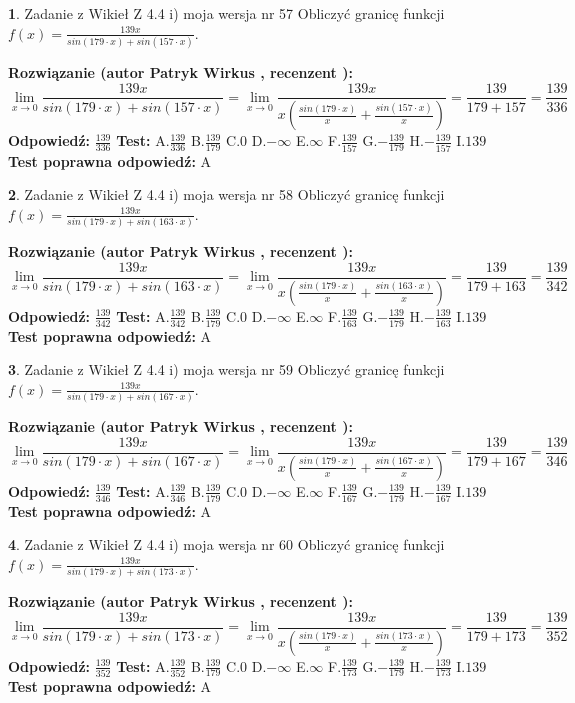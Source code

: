 \documentclass[12pt, a4paper]{article}
\theoremstyle{definition} %
\newtheorem{zad}{}
\newcommand{\zadStart}[1]{\begin{zad}#1\newline}
\newcommand{\zadStop}{\end{zad}}
\newcommand{\rozwStart}[2]{\noindent \textbf{Rozwiązanie (autor #1 , recenzent #2): }\newline}
\newcommand{\rozwStop}{\newline}
\newcommand{\odpStart}{\noindent \textbf{Odpowiedź:}\newline}
\newcommand{\odpStop}{\newline}
\newcommand{\testStart}{\noindent \textbf{Test:}\newline}
\newcommand{\testStop}{\newline}
\newcommand{\kluczStart}{\noindent \textbf{Test poprawna odpowiedź:}\newline}
\newcommand{\kluczStop}{\newline}
\begin{document}
\zadStart{Zadanie z Wikieł Z 4.4 i) moja wersja nr 57}
Obliczyć granicę funkcji $f(x)=\frac{139x}{sin(179\cdot x) +sin(157\cdot x)}$.
\zadStop
\rozwStart{Patryk Wirkus}{}
$$\lim\limits_{x\to 0}\frac{139x}{sin(179\cdot x) +sin(157\cdot x)}=\lim\limits_{x\to 0}\frac{139x}{x(\frac{sin(179\cdot x)}{x}+\frac{sin(157\cdot x)}{x})}=\frac{139}{179+157} = \frac{139}{336}$$
\rozwStop
\odpStart
$\frac{139}{336}$
\odpStop
\testStart
A.$\frac{139}{336}$
B.$\frac{139}{179}$
C.$0$
D.$-\infty$
E.$\infty$
F.$\frac{139}{157}$
G.$-\frac{139}{179}$
H.$-\frac{139}{157}$
I.$139$
\testStop
\kluczStart
A
\kluczStop



\zadStart{Zadanie z Wikieł Z 4.4 i) moja wersja nr 58}
Obliczyć granicę funkcji $f(x)=\frac{139x}{sin(179\cdot x) +sin(163\cdot x)}$.
\zadStop
\rozwStart{Patryk Wirkus}{}
$$\lim\limits_{x\to 0}\frac{139x}{sin(179\cdot x) +sin(163\cdot x)}=\lim\limits_{x\to 0}\frac{139x}{x(\frac{sin(179\cdot x)}{x}+\frac{sin(163\cdot x)}{x})}=\frac{139}{179+163} = \frac{139}{342}$$
\rozwStop
\odpStart
$\frac{139}{342}$
\odpStop
\testStart
A.$\frac{139}{342}$
B.$\frac{139}{179}$
C.$0$
D.$-\infty$
E.$\infty$
F.$\frac{139}{163}$
G.$-\frac{139}{179}$
H.$-\frac{139}{163}$
I.$139$
\testStop
\kluczStart
A
\kluczStop



\zadStart{Zadanie z Wikieł Z 4.4 i) moja wersja nr 59}
Obliczyć granicę funkcji $f(x)=\frac{139x}{sin(179\cdot x) +sin(167\cdot x)}$.
\zadStop
\rozwStart{Patryk Wirkus}{}
$$\lim\limits_{x\to 0}\frac{139x}{sin(179\cdot x) +sin(167\cdot x)}=\lim\limits_{x\to 0}\frac{139x}{x(\frac{sin(179\cdot x)}{x}+\frac{sin(167\cdot x)}{x})}=\frac{139}{179+167} = \frac{139}{346}$$
\rozwStop
\odpStart
$\frac{139}{346}$
\odpStop
\testStart
A.$\frac{139}{346}$
B.$\frac{139}{179}$
C.$0$
D.$-\infty$
E.$\infty$
F.$\frac{139}{167}$
G.$-\frac{139}{179}$
H.$-\frac{139}{167}$
I.$139$
\testStop
\kluczStart
A
\kluczStop



\zadStart{Zadanie z Wikieł Z 4.4 i) moja wersja nr 60}
Obliczyć granicę funkcji $f(x)=\frac{139x}{sin(179\cdot x) +sin(173\cdot x)}$.
\zadStop
\rozwStart{Patryk Wirkus}{}
$$\lim\limits_{x\to 0}\frac{139x}{sin(179\cdot x) +sin(173\cdot x)}=\lim\limits_{x\to 0}\frac{139x}{x(\frac{sin(179\cdot x)}{x}+\frac{sin(173\cdot x)}{x})}=\frac{139}{179+173} = \frac{139}{352}$$
\rozwStop
\odpStart
$\frac{139}{352}$
\odpStop
\testStart
A.$\frac{139}{352}$
B.$\frac{139}{179}$
C.$0$
D.$-\infty$
E.$\infty$
F.$\frac{139}{173}$
G.$-\frac{139}{179}$
H.$-\frac{139}{173}$
I.$139$
\testStop
\kluczStart
A
\kluczStop
\end{document}

